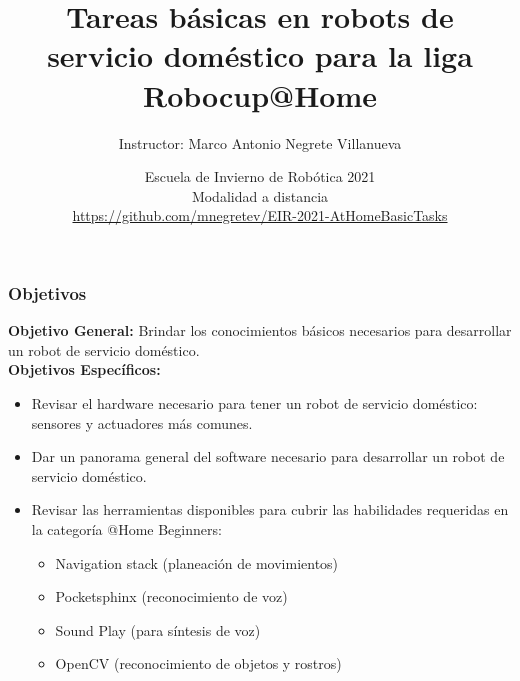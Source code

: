 \documentclass[10pt,spanish,aspectratio=1610]{beamer}
\begin{document}
\renewcommand{\tablename}{Tabla}
\renewcommand{\figurename}{Figura}

\title[Robocup@Home Basic Tasks]{Tareas básicas en robots de servicio doméstico para la liga Robocup@Home}
\author[Marco Negrete]{Instructor: Marco Antonio Negrete Villanueva}
\date[EIR 2021]{Escuela de Invierno de Robótica 2021\\Modalidad a distancia\\\url{https://github.com/mnegretev/EIR-2021-AtHomeBasicTasks}}

\begin{frame}
\titlepage
\end{frame}

\begin{frame}\frametitle{Objetivos}
  \textbf{Objetivo General:} Brindar los conocimientos básicos necesarios para desarrollar un robot de servicio doméstico.
  \\
  \textbf{Objetivos Específicos:}
  \begin{itemize}
  \item Revisar el hardware necesario para tener un robot de servicio doméstico: sensores y actuadores más comunes.
  \item Dar un panorama general del software necesario para desarrollar un robot de servicio doméstico.
  \item Revisar las herramientas disponibles para cubrir las habilidades requeridas en la categoría @Home Beginners:
    \begin{itemize}
    \item Navigation stack (planeación de movimientos)
    \item Pocketsphinx (reconocimiento de voz)
    \item Sound Play (para síntesis de voz)
    \item OpenCV (reconocimiento de objetos y rostros)
    \end{itemize}
  \end{itemize}
\end{frame}

\end{document}
